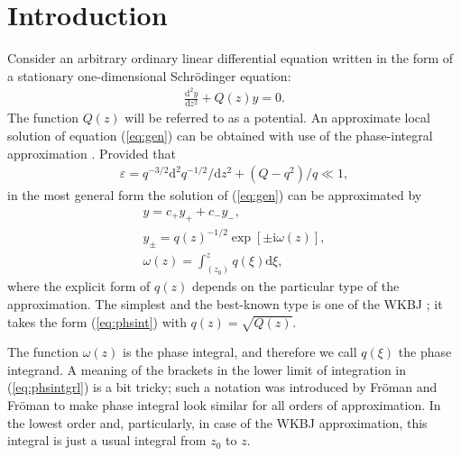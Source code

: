 \documentclass[asy]{iosart2x}
\def\rmi{\mathrm{i}}
\def\rmd{\mathrm{d}}
\def\w{\omega}
\newcommand\eref[1]{(\ref{#1})}
\newcommand\phsintgrnd[1][z]{q(#1)}
\newcommand\predexp[1][z]{q(#1)^{-1/2}}
\newcommand\phsintgrl[3][z]{\int_{#2}^{#3} \phsintgrnd[#1] \rmd #1}
\begin{document}
\section{Introduction \label{sec:intro}}
Consider an arbitrary ordinary linear differential equation written in the form of 
a stationary one-dimensional Schr\"odinger equation:
\begin{eqnarray}
\frac{\rmd^2 y}{\rmd z^2} + Q(z)y = 0.   \label{eq:gen}
\end{eqnarray}
The function $Q(z)$ will be referred to as a potential. An approximate local solution 
of equation \eref{eq:gen} can be obtained with use of the phase-integral approximation \cite{frbook}. 
Provided that 
\begin{eqnarray}
\varepsilon = q^{-3/2} \rmd^2 q^{-1/2}/\rmd z^2  + (Q - q^2)/q \ll 1,   \label{eq:cond}
\end{eqnarray}
in the most general form the solution of \eref{eq:gen} can be approximated by
\begin{subequations}
\begin{eqnarray}
y = c_+y_+ + c_-y_-, \label{eq:gensol}
\\
y_\pm = \predexp \exp [\pm \rmi \w(z)], \label{eq:phsint}
\\
\w(z)=\phsintgrl[\xi]{(z_0)}{z}, \label{eq:phsintgrl}
\end{eqnarray}
\end{subequations}
where the explicit form of $q(z)$ depends on the particular type of the approximation.
The simplest and the best-known type is one of the WKBJ \cite{wkb1,wkb2,wkb3,wkbj}; 
it takes the form \eref{eq:phsint} with $\phsintgrnd = \sqrt{Q(z)}$.

The function $\w(z)$ is the phase integral, and therefore we call $\phsintgrnd[\xi]$ 
the phase integrand. A meaning of the brackets in the lower limit of integration in \eref{eq:phsintgrl}
is a bit tricky; such a notation was introduced by Fr\"oman and Fr\"oman \cite{frpaper} to make
phase integral look similar for all orders of approximation. In the lowest order and, particularly,
in case of the WKBJ approximation, this integral is just a usual integral from $z_0$ to $z$. 
\end{document}
